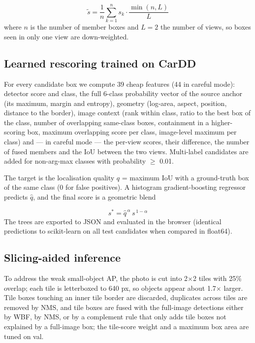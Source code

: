\documentclass[10pt,twocolumn]{article}
\begin{document}
\begin{equation}\tilde{s} = \frac{1}{n}\sum_{k=1}^{n} s_k \cdot \frac{\min(n, L)}{L}\end{equation}
where $n$ is the number of member boxes and $L = 2$ the number of views, so boxes seen in only one view are down-weighted.

\subsection{Learned rescoring trained on CarDD}
For every candidate box we compute 39 cheap features (44 in careful mode): detector score and class, the full 6-class probability vector of the source anchor (its maximum, margin and entropy), geometry (log-area, aspect, position, distance to the border), image context (rank within class, ratio to the best box of the class, number of overlapping same-class boxes, containment in a higher-scoring box, maximum overlapping score per class, image-level maximum per class) and --- in careful mode --- the per-view scores, their difference, the number of fused members and the IoU between the two views. Multi-label candidates are added for non-arg-max classes with probability $\ge$ 0.01.

The target is the localisation quality $q$ = maximum IoU with a ground-truth box of the same class (0 for false positives). A histogram gradient-boosting regressor predicts $\hat{q}$, and the final score is a geometric blend

\begin{equation}s^{*} = \hat{q}^{\,\alpha}\, s^{\,1-\alpha}\end{equation}
The trees are exported to JSON and evaluated in the browser (identical predictions to scikit-learn on all test candidates when compared in float64).

\subsection{Slicing-aided inference}
To address the weak small-object AP, the photo is cut into 2$\times$2 tiles with 25\% overlap; each tile is letterboxed to 640 px, so objects appear about 1.7$\times$ larger. Tile boxes touching an inner tile border are discarded, duplicates across tiles are removed by NMS, and tile boxes are fused with the full-image detections either by WBF, by NMS, or by a complement rule that only adds tile boxes not explained by a full-image box; the tile-score weight and a maximum box area are tuned on val.
\end{document}
